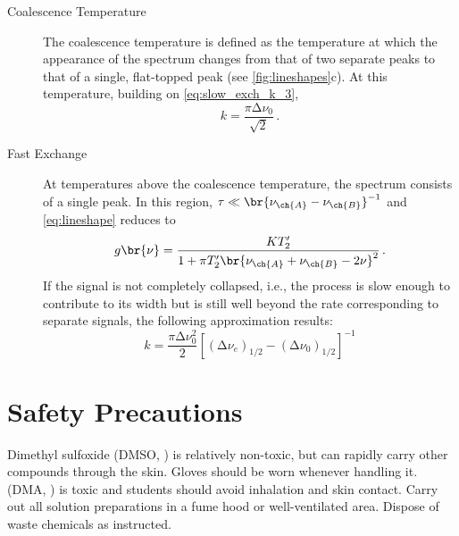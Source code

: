 \begin{description}
	\item[Coalescence Temperature]

	The coalescence temperature is defined as the temperature at which the appearance of the spectrum changes from that of two separate peaks to that of a single, flat-topped peak (see \cref{fig:lineshapes}c). 
At this temperature, building on \cref{eq:slow_exch_k_3}, 
	\begin{equation}
  	k = \frac{\pi \increment \nu_0}{\sqrt{2}} \, .
  	\label{eq:intermed_exch_k}
	\end{equation}

	\item[Fast Exchange]

	At temperatures above the coalescence temperature, the spectrum consists of a single peak. 
	In this region, \( \tau \ll \br{\nu_{\ch{A}} - \nu_{\ch{B}}}^{-1} \) and \cref{eq:lineshape} reduces to
	\begin{equation}
		g\br{\nu} = \frac{K T'_2}{1 + \pi T'_2 \br{\nu_{\ch{A}} + \nu_{\ch{B}} - 2 \nu}^2} \, .
		\label{eq:fast_exch_lineshape}
	\end{equation}
	If the signal is not completely collapsed, i.e., the process is slow enough to contribute to its width but is still well beyond the rate corresponding to separate signals, the following approximation results:
	\begin{equation}
		k = \frac{\pi \increment \nu_0^2}{2} [(\increment \nu_e)_{1/2} - (\increment \nu_0)_{1/2}]^{-1}
		\label{eq:fast_exch_k}
	\end{equation}

\end{description}


\pagebreak

\section{Safety Precautions} %
\label{sec:safety}

Dimethyl sulfoxide (DMSO, ) is relatively non-toxic, but can rapidly carry other compounds through the skin. 
Gloves should be worn whenever handling it. 
 (DMA, ) is toxic and students should avoid inhalation and skin contact. 
Carry out all solution preparations in a fume hood or well-ventilated area. 
Dispose of waste chemicals as instructed. 



